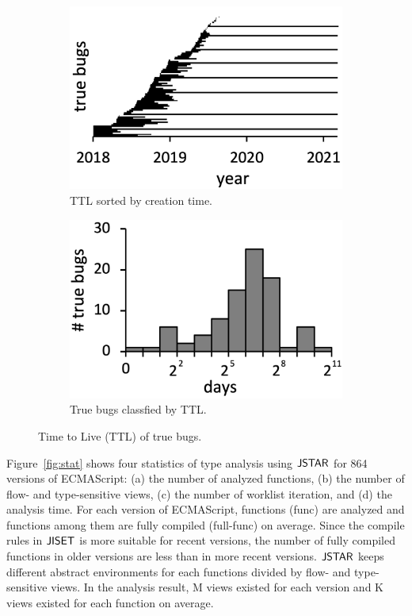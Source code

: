 \begin{figure}
  \centering
  \begin{subfigure}[b]{0.24\textwidth}
    \includegraphics[width=\textwidth]{img/ttl-chro}
    \caption{TTL sorted by creation time.}
  \end{subfigure}
  \begin{subfigure}[b]{0.24\textwidth}
    \includegraphics[width=\textwidth]{img/ttl-count}
    \caption{True bugs classfied by TTL.}
  \end{subfigure}
  \caption{Time to Live (TTL) of true bugs.}
  \vspace*{-1.5em}
  \label{fig:ttl}
\end{figure}

Figure~\ref{fig:stat} shows four statistics of type analysis using $\tool$ for
864 versions of ECMAScript: (a) the number of analyzed functions, (b) the number
of flow- and type-sensitive views, (c) the number of worklist iteration, and (d)
the analysis time.  For each version of ECMAScript,  functions
(\textsf{func}) are analyzed and  functions among them are fully
compiled (\textsf{full-func}) on average.  Since the compile rules in $\jiset$
is more suitable for recent versions, the number of fully compiled functions in
older versions are less than in more recent versions.  $\tool$ keeps different
abstract environments for each functions divided by flow- and type-sensitive
views.  In the analysis result, M views existed for each version and
K views existed for each function on average.

